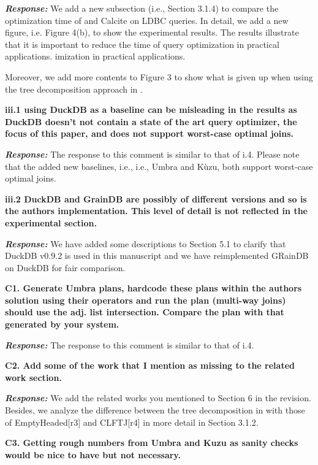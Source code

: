 \textbf{\textit{Response: }}
We add a new subsection (i.e., Section 3.1.4) to compare the optimization time of \name and Calcite on LDBC queries.
In detail, we add a new figure, i.e. Figure 4(b), to show the experimental results.
The results illustrate that it is important to reduce the time of query optimization in practical applications.
imization in practical applications.

Moreover, we add more contents to Figure 3 to show what is given up when using the tree decomposition approach in \name.


\textbf{
iii.1 using DuckDB as a baseline can be misleading in the results
as DuckDB doesn't not contain a state of the art query optimizer, the focus of this paper, and does not support worst-case optimal joins.}

\textbf{\textit{Response: }}
The response to this comment is similar to that of i.4.
Please note that the added new baselines, i.e., i.e., Umbra and K\`uzu, both support worst-case optimal joins.


\textbf{
iii.2 DuckDB and GrainDB are possibly of different versions and so is the authors implementation. This level of detail is not reflected in the experimental section.}

\textbf{\textit{Response: }}
We have added some descriptions to Section 5.1 to clarify that DuckDB v0.9.2 is used in this manuscript and we have reimplemented GRainDB on DuckDB for fair comparison.


\textbf{
C1. Generate Umbra plans, hardcode these plans within the authors solution using their operators and run the plan (multi-way joins) should use the adj. list intersection. Compare the plan with that generated by your system. }

\textbf{\textit{Response: }}
The response to this comment is similar to that of i.4.

\textbf{
C2. Add some of the work that I mention as missing to the related work section.}

\textbf{\textit{Response: }} We add the related works you mentioned to Section 6 in the revision. Besides, we analyze the difference between the tree decomposition in \name with those of EmptyHeaded[r3] and CLFTJ[r4] in more detail in Section 3.1.2.


\textbf{
C3. Getting rough numbers from Umbra and Kuzu as sanity checks would be nice to have but not necessary.}

